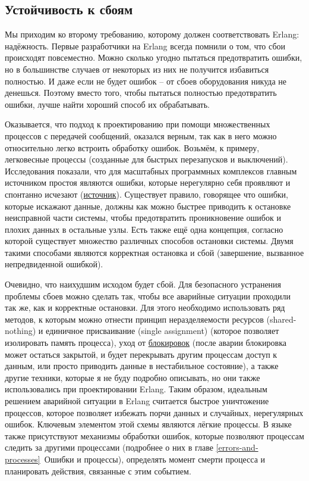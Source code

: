 \subsection{Устойчивость к сбоям}
\label{fault-tolerance}
Мы приходим ко второму требованию, которому должен соответствовать Erlang: надёжность.
Первые разработчики на Erlang всегда помнили о том, что сбои происходят повсеместно.
Можно сколько угодно пытаться предотвратить ошибки, но в большинстве случаев от некоторых из них не получится избавиться полностью.
И даже если не будет ошибок \--- от сбоев оборудования никуда не денешься.
Поэтому вместо того, чтобы пытаться полностью предотвратить ошибки, лучше найти хороший способ их обрабатывать.

Оказывается, что подход к проектированию при помощи множественных процессов с передачей сообщений, оказался верным, так как в него можно относительно легко встроить обработку ошибок.
Возьмём, к примеру, легковесные процессы (созданные для быстрых перезапусков и выключений).
Исследования показали, что для масштабных программных комплексов главным источником простоя являются ошибки, которые нерегулярно себя проявляют и спонтанно исчезают (\href{http://dslab.epfl.ch/pubs/crashonly/}{источник}).
Существует правило, говорящее что ошибки, которые искажают данные, должны как можно быстрее приводить к остановке неисправной части системы, чтобы предотвратить проникновение ошибок и плохих данных в остальные узлы.
Есть также ещё одна концепция, согласно которой существует множество различных способов остановки системы.
Двумя такими способами являются корректная остановка и сбой (завершение, вызванное непредвиденной ошибкой).

Очевидно, что наихудшим исходом будет сбой.
Для безопасного устранения проблемы сбоев можно сделать так, чтобы все аварийные ситуации проходили так же, как и корректные остановки.
Для этого необходимо использовать ряд методов, к которым можно отнести принцип неразделяемости ресурсов (shared-nothing) и единичное присваивание (single assignment) (которое позволяет изолировать память процесса), уход от \href{http://en.wikipedia.org/wiki/Lock_(computer_science)}{блокировок} (после аварии блокировка может остаться закрытой, и будет перекрывать другим процессам доступ к данным, или просто приводить данные в нестабильное состояние), а также другие техники, которые я не буду подробно описывать, но они также использовались при проектировании Erlang.
Таким образом, идеальным решением аварийной ситуации в Erlang считается быстрое уничтожение процессов, которое позволяет избежать порчи данных и случайных, нерегулярных ошибок.
Ключевым элементом этой схемы являются лёгкие процессы.
В языке также присутствуют механизмы обработки ошибок, которые позволяют процессам следить за другими процессами (подробнее о них в главе \ref{errors-and-processes}~Ошибки и процессы), определять момент смерти процесса и планировать действия, связанные с этим событием.

